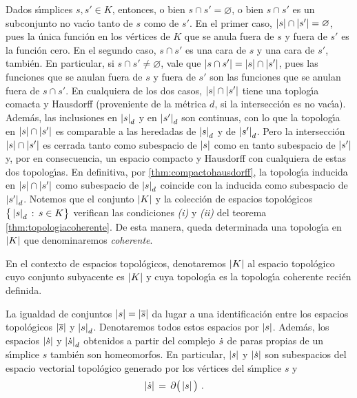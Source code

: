 Dados s\'{\i}mplices $s,s'\in K$, entonces, o bien $s\cap s'=\varnothing$,
o bien $s\cap s'$ es un subconjunto no vac\'{\i}o tanto de $s$ como de $s'$.
En el primer caso, $\left|s\right|\cap\left|s'\right|=\varnothing$, pues la \'{u}nica
funci\'{o}n en los v\'{e}rtices de $K$ que se anula fuera de $s$ y fuera
de $s'$ es la funci\'{o}n cero. En el segundo caso, $s\cap s'$ es una cara
de $s$ y una cara de $s'$, tambi\'{e}n. En particular, si
$s\cap s'\not=\varnothing$, vale que $\left|s\cap s'\right|=\left|s\right|\cap\left|s'\right|$,
pues las funciones que se anulan fuera de $s$ y fuera de $s'$ son las
funciones que se anulan fuera de $s\cap s'$. En cualquiera de los dos casos,
$\left|s\right|\cap\left|s'\right|$ tiene una toplog\'{\i}a comacta y Hausdorff
(proveniente de la m\'{e}trica $d$, si la intersecci\'{o}n es no vac\'{\i}a).
Adem\'{a}s, las inclusiones en $\left|s\right|_{d}$ y en $\left|s'\right|_{d}$ son
continuas, con lo que la topolog\'{\i}a en $\left|s\right|\cap\left|s'\right|$ es
comparable a las heredadas de $\left|s\right|_{d}$ y de $\left|s'\right|_{d}$. Pero
la intersecci\'{o}n $\left|s\right|\cap\left|s'\right|$ es cerrada tanto como subespacio
de $\left|s\right|$ como en tanto subespacio de $\left|s'\right|$ y, por en consecuencia,
un espacio compacto y Hausdorff con cualquiera de estas dos topolog\'{\i}as.
En definitiva, por \ref{thm:compactohausdorff}, la topolog\'{\i}a inducida
en $\left|s\right|\cap\left|s'\right|$ como subespacio de $\left|s\right|_{d}$ coincide con
la inducida como subespacio de $\left|s'\right|_{d}$. Notemos que el conjunto
$\left|K\right|$ y la colecci\'{o}n de espacios topol\'{o}gicos
$\big\{\left|s\right|_{d}\,:\,s\in K\big\}$ verifican las condiciones
\emph{(i)} y \emph{(ii)} del teorema \ref{thm:topologiacoherente}.
De esta manera, queda determinada una topolog\'{\i}a en $\left|K\right|$ que
denominaremos \emph{coherente}.

En el contexto de espacios topol\'{o}gicos, denotaremos $\left|K\right|$ al espacio
topol\'{o}gico cuyo conjunto subyacente es $\left|K\right|$ y cuya topolog\'{\i}a
es la topolog\'{\i}a coherente reci\'{e}n definida.

\begin{obsTopologiaEnSimplices}\label{obs:topologiaensimplices}
	La igualdad de conjuntos $\left|s\right|=\left|\overline{s}\right|$ da lugar a
	una identificaci\'{o}n entre los espacios topol\'{o}gicos
	$\left|\overline{s}\right|$ y $\left|s\right|_{d}$. Denotaremos todos estos
	espacios por $\left|s\right|$. Adem\'{a}s, los espacios
	$\left|\dot{s}\right|$ y $\left|\dot{s}\right|_{d}$ obtenidos a partir
	del complejo $\dot{s}$ de paras propias de un s\'{\i}mplice
	$s$ tambi\'{e}n son homeomorfos. En particular, $\left|s\right|$ y
	$\left|\dot{s}\right|$ son subespacios del espacio vectorial
	topol\'{o}gico generado por los v\'{e}rtices del s\'{\i}mplice $s$ y
	\begin{align*}
		\left|\dot{s}\right| & \,=\,\partial_{}\big(\left|s\right|\big)
		\text{ .}
	\end{align*}
\end{obsTopologiaEnSimplices}

